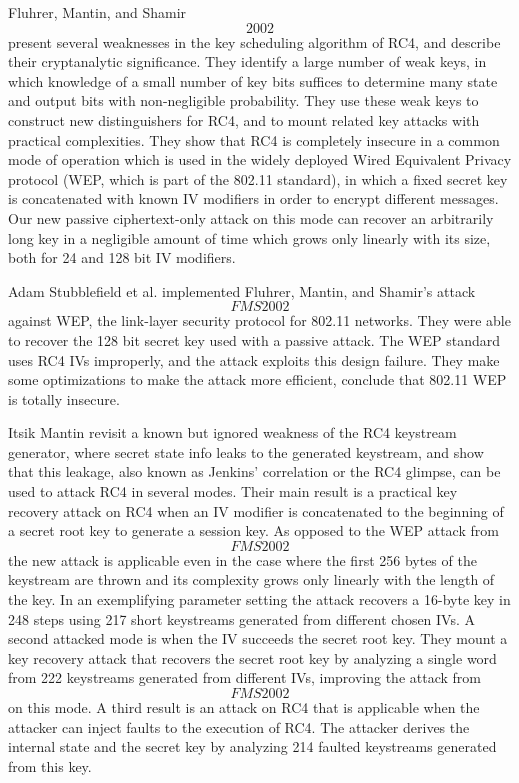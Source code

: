 \documentclass[a4paper,12pt,pagesize,headsepline,bibtotoc,titlepage]{scrartcl}
\begin{document}
Fluhrer, Mantin, and Shamir\[2002\] present several weaknesses in the key scheduling algorithm of RC4, and describe their cryptanalytic significance. They identify a large number of weak keys, in which knowledge of a small number of key bits suffices to determine many state and output bits with non-negligible probability. They use these weak keys to construct new distinguishers for RC4, and to mount related key attacks with practical complexities. They show that RC4 is completely insecure in a common mode of operation which is used in the widely deployed Wired Equivalent Privacy protocol (WEP, which is part of the 802.11 standard), in which a fixed secret key is concatenated with known IV modifiers in order to encrypt different messages. Our new passive ciphertext-only attack on this mode can recover an arbitrarily long key in a negligible amount of time which grows only linearly with its size, both for 24 and
128 bit IV modifiers.


Adam Stubblefield et al. implemented Fluhrer, Mantin, and Shamir’s attack \[FMS2002\] against WEP, the link-layer security protocol for 802.11 networks. They were able to recover the 128 bit secret key used with a passive attack. The WEP standard uses RC4 IVs improperly, and the attack exploits this design failure. They make some optimizations to make the attack more efficient, conclude that 802.11 WEP is totally insecure.


Itsik Mantin revisit a known but ignored weakness of the RC4 keystream generator, where secret state info leaks to the generated keystream, and show that this leakage, also known as Jenkins’ correlation or the RC4 glimpse, can be used to attack RC4 in several modes. Their main result is a practical key recovery attack on RC4 when an IV modifier is concatenated to the beginning of a secret root key to generate a session key. As opposed to the WEP attack from \[FMS2002\] the new attack is applicable even in the case where the first 256 bytes of the keystream are thrown and its complexity grows only linearly with the length of the key. In an exemplifying parameter setting the attack recovers a 16-byte key in 248 steps using 217 short keystreams generated from different chosen IVs. A second attacked mode is when the IV succeeds the secret root key. They mount a key recovery attack that recovers the secret root key by analyzing a single word from 222 keystreams generated from different IVs, improving the attack from \[FMS2002\] on this mode. A third result is an attack on RC4 that is applicable when the attacker can inject faults to the execution of RC4. The attacker derives the internal state and the secret key by analyzing 214 faulted keystreams generated from this key.
\end{document}
